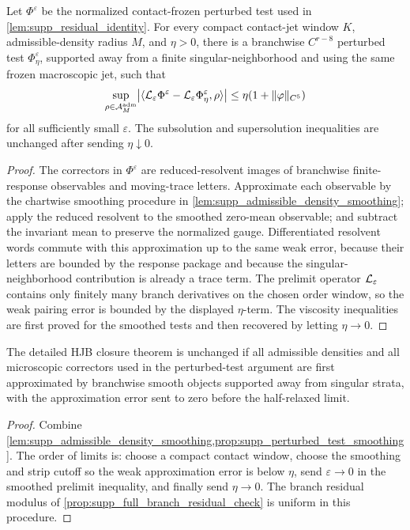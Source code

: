 \begin{proposition}
\label{prop:supp_perturbed_test_smoothing}
Let \(\Phi^\varepsilon\) be the normalized contact-frozen perturbed test used
in \cref{lem:supp_residual_identity}.  For every compact contact-jet window
\(K\), admissible-density radius \(M\), and \(\eta>0\), there is a branchwise
\(C^{r-8}\) perturbed test \(\Phi^\varepsilon_\eta\), supported away from a
finite singular-neighborhood and using the same frozen macroscopic jet, such
that
\[
  \sup_{\rho\in\mathcal A^{\mathrm{adm}}_M}
  \bigl|
  \langle
  \mathcal L_\varepsilon \Phi^\varepsilon
  -\mathcal L_\varepsilon \Phi^\varepsilon_\eta,\rho
  \rangle
  \bigr|
  \le
  \eta(1+\|\varphi\|_{C^5})
\]
for all sufficiently small \(\varepsilon\).  The subsolution and supersolution
inequalities are unchanged after sending \(\eta\downarrow0\).
\end{proposition}

\begin{proof}
The correctors in \(\Phi^\varepsilon\) are reduced-resolvent images of
branchwise finite-response observables and moving-trace letters.  Approximate
each observable by the chartwise smoothing procedure in
\cref{lem:supp_admissible_density_smoothing}; apply the reduced resolvent to
the smoothed zero-mean observable; and subtract the invariant mean to preserve
the normalized gauge.  Differentiated resolvent words commute with this
approximation up to the same weak error, because their letters are bounded by
the response package and because the singular-neighborhood contribution is
already a trace term.  The prelimit operator \(\mathcal L_\varepsilon\) contains
only finitely many branch derivatives on the chosen order window, so the weak
pairing error is bounded by the displayed \(\eta\)-term.  The viscosity
inequalities are first proved for the smoothed tests and then recovered by
letting \(\eta\to0\).
\end{proof}

\begin{corollary}
\label{cor:supp_smooth_approximation_closure}
The detailed HJB closure theorem is unchanged if all admissible densities and
all microscopic correctors used in the perturbed-test argument are first
approximated by branchwise smooth objects supported away from singular strata,
with the approximation error sent to zero before the half-relaxed limit.
\end{corollary}

\begin{proof}
Combine \cref{lem:supp_admissible_density_smoothing,prop:supp_perturbed_test_smoothing}.
The order of limits is: choose a compact contact window, choose the smoothing
and strip cutoff so the weak approximation error is below \(\eta\), send
\(\varepsilon\to0\) in the smoothed prelimit inequality, and finally send
\(\eta\to0\).  The branch residual modulus of
\cref{prop:supp_full_branch_residual_check} is uniform in this procedure.
\end{proof}

